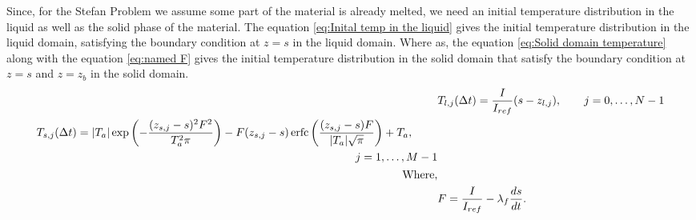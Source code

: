 Since, for the Stefan Problem we assume some part of the material is already melted, we need an initial temperature distribution in the liquid  as well as the solid phase of the material. The equation \eqref{eq:Inital temp in the liquid} gives the initial temperature distribution in the liquid domain, satisfying the boundary condition at $z = s$ in the liquid domain. Where as, the equation \ref{eq:Solid domain temperature} along with the equation \ref{eq:named F} gives the initial temperature distribution in the solid domain  that satisfy the boundary condition at $z = s$ and $z = z_b$  in the solid domain.\\
\begin{subequations}
    \begin{align}
        &T_{l,j}(\Delta t) = \frac{I}{I_{ref}}(s-z_{l,j}), \quad \quad j=0,\ldots,N-1 \label{eq:Inital temp in the liquid} \\
        \begin{split}
        &T_{s,j}(\Delta t) = |T_a|\exp\left(-\frac{(z_{s,j}-s)^2 F^2}{T_a^2 \pi}\right)-F(z_{s,j}-s)\operatorname{erfc}\left(\frac{(z_{s,j}-s)F}{|T_a|\sqrt{\pi}}\right) + T_a,\label{eq:Solid domain temperature}\\
        &\hspace{10cm} j = 1,\ldots,M-1 
        \end{split}\\
        \nonumber \text{Where,}\\
        &F = \frac{I}{I_{ref}}-\lambda_f \frac{ds}{dt}\label{eq:named F}.        
    \end{align}\\
    \nonumber \text{}\\ 
    
\end{subequations}

